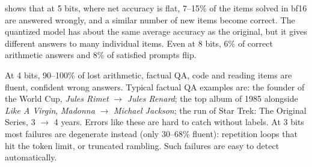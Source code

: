 \begin{table}[t]
\centering
\caption{Answer flips relative to bf16, pooled over models. \emph{Lost} counts items correct in bf16 but wrong after quantization, and \emph{gained} counts the reverse. \emph{Fluent} is the share of lost items whose output terminated normally, \ie without a repetition loop or hitting the token limit. Rows pool different model subsets per level (\phithree only at 4/3 bits). Below 4 bits, losses far exceed gains, and the errors change from fluent to degenerate.}
\label{tab:flips}
\end{table}

  shows that at 5 bits, where net accuracy is flat, 7--15\% of the items solved in bf16 are answered wrongly, and a similar number of new items become correct. The quantized model has about the same average accuracy as the original, but it gives different answers to many individual items. Even at 8 bits, 6\% of correct arithmetic answers and 8\% of satisfied \ifeval prompts flip.

 At 4 bits, 90--100\% of lost arithmetic, factual QA, code and reading items are fluent, confident wrong answers. Typical factual QA examples are: the founder of the World Cup, \emph{Jules Rimet} $\to$ \emph{Jules Renard}; the top album of 1985 alongside \emph{Like A Virgin}, \emph{Madonna} $\to$ \emph{Michael Jackson}; the run of Star Trek: The Original Series, 3 $\to$ 4 years. Errors like these are hard to catch without labels. At 3 bits most failures are degenerate instead (only 30--68\% fluent): repetition loops that hit the token limit, or truncated rambling. Such failures are easy to detect automatically.

